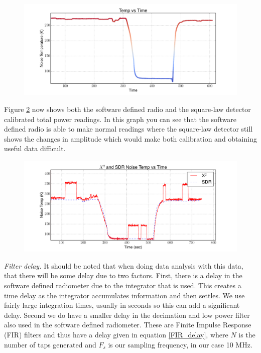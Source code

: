 {\begin{figure}[h!tb] \centering
\includegraphics[width=\textwidth]{Experiments/Exp4/calib_filtered.pdf}
\label{sdr_calib_filter}
\end{figure}

Figure \ref{filter_on} now shows both the software defined radio and the square-law detector calibrated total power readings.  In this graph you can see that the software defined radio is able to make normal readings where the square-law detector still shows the changes in amplitude which would make both calibration and obtaining useful data difficult.

\begin{figure}[h!tb] \centering
\includegraphics[width=\textwidth]{Experiments/Exp4/calib_filtered_both.pdf}
\label{filter_on}
\end{figure}

\emph{Filter delay.}  It should be noted that when doing data analysis with this data, that there will be some delay due to two factors.  First, there is a delay in the software defined radiometer due to the integrator that is used.  This creates a time delay as the integrator accumulates information and then settles.  We use fairly large integration times, usually in seconds so this can add a significant delay.  Second we do have a smaller delay in the decimation and low power filter also used in the software defined radiometer.  These are Finite Impulse Response (FIR) filters and thus have a delay given in equation \ref{FIR_delay}, where $N$ is the number of taps generated and $F_{s}$ is our sampling frequency, in our case 10 MHz.

}
